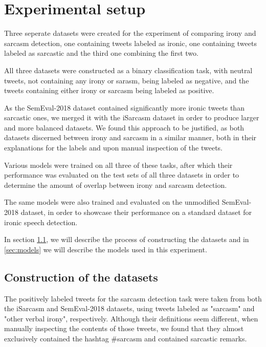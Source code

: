 \documentclass[10pt, a4paper]{article}
\begin{document}
\section{Experimental setup}

Three seperate datasets were created for the experiment of comparing irony and sarcasm detection, one containing tweets labeled
as ironic, one containing tweets labeled as sarcastic and the third one combining the first two.

All three datasets were constructed as a binary classification task, with neutral tweets, not containing any irony or sarasm,
being labeled as negative, and the tweets containing either irony or sarcasm being labeled as positive.

As the SemEval-2018 dataset contained significantly more
ironic tweets than sarcastic ones, we merged it with the iSarcasm dataset in order to produce larger and more balanced datasets.
We found this approach to be justified, as both datasets discerned between irony and sarcasm in a similar manner, both in
their explanations for the labels and upon manual inspection of the tweets. 

Various models were trained on all three of these tasks, after which their performance was evaluated on the test sets of all
three datasets in order to determine the amount of overlap between irony and sarcasm detection.

The same models were also trained and evaluated on the unmodified SemEval-2018 dataset, in order to showcase their performance
on a standard dataset for ironic speech detection.

In section \ref{sec:dataset_construction}, we will describe the process of constructing the datasets and in \ref{sec:models}
we will describe the models used in this experiment.

\subsection{Construction of the datasets}\label{sec:dataset_construction}

The positively labeled tweets for the sarcasm detection task were taken from both the iSarcasm and SemEval-2018 
datasets, using tweets labeled as "sarcasm" and "other verbal irony", respectively. Although their definitions 
seem different, when manually inspecting the contents of those tweets, we found that they almost exclusively 
contained the hashtag \#sarcasm and contained sarcastic remarks. 
\end{document}
